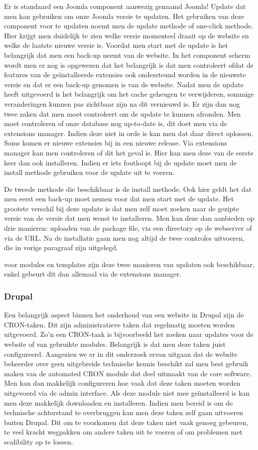 Er is standaard een Joomla component aanwezig genaamd Joomla! Update dat men kan gebruiken om onze Joomla versie te updaten. Het gebruiken van deze component voor te updaten noemt men de update methode of one-click methode. Hier krijgt men duidelijk te zien welke versie momenteel draait op de website en welke de laatste nieuwe versie is. Voordat men start met de update is het belangrijk dat men een back-up neemt van de website. In het component scherm wordt men er nog is opgewezen dat het belangrijk is dat men controleert ofdat de features van de geïnstalleerde extensies ook ondersteund worden in de nieuwste versie en dat er een back-up genomen is van de website. Nadat men de update heeft uitgevoerd is het belangrijk om het cache geheugen te verwijderen, sommige veranderingen kunnen pas zichtbaar zijn na dit vernieuwd is. Er zijn dan nog twee zaken dat men moet controleert om de update te kunnen afronden. Men moet controleren of onze database nog up-to-date is, dit doet men via de extensions manager. Indien deze niet in orde is kan men dat daar direct oplossen. Soms komen er nieuwe extensies bij in een nieuwe release. Via extensions manager kan men controleren of dit het geval is. Hier kan men deze van de eerste keer dan ook installeren. Indien er iets foutloopt bij de update moet men de install methode gebruiken voor de update uit te voeren.

De tweede methode die beschikbaar is de install methode. Ook hier geldt het dat men eerst een back-up moet nemen voor dat men start met de update. Het grootste verschil bij deze update is dat men zelf moet zoeken naar de gezipte versie van de versie dat men wenst te installeren. Men kan deze dan aanbieden op drie manieren: uploaden van de package file, via een directory op de webserver of via de URL. Na de installatie gaan men nog altijd de twee controles uitvoeren, die in vorige paragraaf zijn uitgelegd.

voor modules en templates zijn deze twee manieren van updaten ook beschikbaar, enkel gebeurt dit dan allemaal via de extensions manager.


\subsubsection{Drupal}
Een belangrijk aspect binnen het onderhoud van een website in Drupal zijn de CRON-taken. Dit zijn administratieve taken dat regelmatig moeten worden uitgevoerd. Zo'n een CRON-taak is bijvoorbeeld het zoeken naar updates voor de website of van gebruikte modules. Belangrijk is dat men deze taken juist configureerd. Aangezien we er in dit onderzoek ervan uitgaan dat de website beheerder over geen uitgebreide technische kennis beschikt zal men best gebruik maken van de automated CRON module dat deel uitmaakt van de core software. Men kan dan makkelijk configureren hoe vaak dat deze taken moeten worden uitgevoerd via de admin interface. Als deze module niet mee geïnstalleerd is kan men deze makkelijk downloaden en installeren. Indien men bereid is om de technische achterstand te overbruggen kan men deze taken zelf gaan uitvoeren buiten Drupal. Dit om te voorkomen dat deze taken niet vaak genoeg gebeuren, te veel kracht wegpakken om andere taken uit te voeren of om problemen met scalibility op te lossen.

